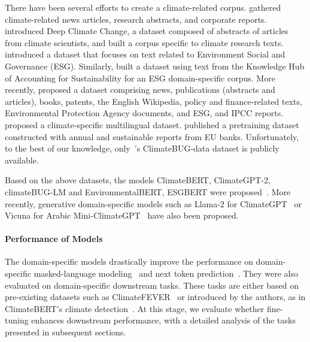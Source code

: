 \datasets There have been several efforts to create a climate-related corpus. \citet{nicolas_webersinke_climatebert_2021} gathered climate-related news articles, research abstracts, and corporate reports. 
\citet{vaghefi2022deep} introduced Deep Climate Change, a dataset composed of abstracts of articles from climate scientists, and built a corpus specific to climate research texts. 
\citet{schimanski_bridging_2023} introduced a dataset that focuses on text related to Environment Social and Governance (ESG). Similarly, \citet{Mehra_2022} built a dataset using text from the Knowledge Hub of Accounting for Sustainability for an ESG domain-specific corpus.
More recently, \citet{thulke2024climategpt} proposed a dataset comprising news, publications (abstracts and articles), books, patents, the English Wikipedia, policy and finance-related texts, Environmental Protection Agency documents, and ESG, and IPCC reports. \citet{mullappilly-etal-2023-arabic} proposed a climate-specific multilingual dataset. \citet{yu_climatebug_2024} published a pretraining dataset constructed with annual and sustainable reports from EU banks. 
Unfortunately, to the best of our knowledge, only~\citet{yu_climatebug_2024}'s ClimateBUG-data dataset is publicly available. 

\solutions Based on the above datasets, the models ClimateBERT, ClimateGPT-2, climateBUG-LM and EnvironmentalBERT, ESGBERT were proposed~\cite{nicolas_webersinke_climatebert_2021, vaghefi2022deep, yu_climatebug_2024, schimanski_bridging_2023, Mehra_2022}. 
More recently, generative domain-specific models such as Llama-2 for ClimateGPT~\cite{thulke2024climategpt} or Vicuna for Arabic Mini-ClimateGPT~\cite{mullappilly-etal-2023-arabic} have also been proposed. 

\paragraph{Performance of Models} The domain-specific models drastically improve the performance on domain-specific masked-language modeling~\cite{nicolas_webersinke_climatebert_2021, yu_climatebug_2024} and next token prediction~\cite{vaghefi2022deep}. They were also evaluated on domain-specific downstream tasks. These tasks are either based on pre-existing datasets such as ClimateFEVER~\cite{diggelmann_climate-fever_2020} or introduced by the authors, as in ClimateBERT's climate detection~\cite{nicolas_webersinke_climatebert_2021}. At this stage, we evaluate whether fine-tuning enhances downstream performance, with a detailed analysis of the tasks presented in subsequent sections.

